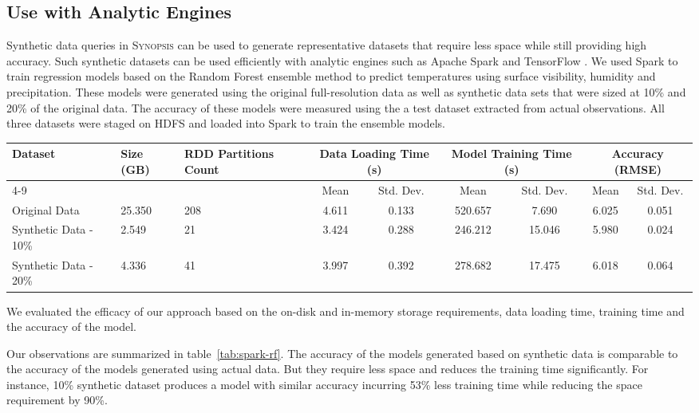 \subsection{Use with Analytic Engines}
Synthetic data queries in \textsc{Synopsis} can be used to generate representative datasets that require less space while still providing high accuracy.  
Such synthetic datasets can be used efficiently with analytic engines such as Apache Spark \cite{zaharia2010spark} and TensorFlow \cite{tensorflow}.  
We used Spark to train regression models based on the Random Forest ensemble method to predict temperatures using surface visibility, humidity and precipitation.
These models were generated using the original full-resolution data as well as synthetic data sets that were sized at 10\% and 20\% of the original data.
The accuracy of these models were measured using the a test dataset extracted from actual observations.
All three datasets were staged on HDFS and loaded into Spark to train the ensemble models.
%
\begin{table*}
    \renewcommand{\arraystretch}{1.3}
    \caption{Comparing Random Forest based regression models generated by Spark MLlib using synthetic vs. real data}
    \label{tab:spark-rf}
    \begin{center}
        \begin{tabularx}{0.98\textwidth}{|X|X|X|c|c|c|c|c|c|}
            \hline
            \multirow{2}{*}{Dataset} & \multirow{2}{*}{Size (GB)} & \multirow{2}{*}{RDD Partitions Count} & \multicolumn{2}{c|}{\cellcolor[gray]{0.7}Data Loading Time (s)} &\multicolumn{2}{c|}{\cellcolor[gray]{0.7}Model Training Time (s)} & \multicolumn{2}{c|}{\cellcolor[gray]{0.7}Accuracy (RMSE)}\\
            \cline{4-9}
             & & & \cellcolor[gray]{0.9}Mean & \cellcolor[gray]{0.9}Std. Dev.  &  \cellcolor[gray]{0.9}Mean & \cellcolor[gray]{0.9}Std. Dev. &  \cellcolor[gray]{0.9}Mean & \cellcolor[gray]{0.9}Std. Dev. \\
            \hline
            Original Data & 25.350 & 208 & 4.611 & 0.133 & 520.657 & 7.690 & 6.025 & 0.051 \\
            \hline
            Synthetic Data - 10\% & 2.549 & 21 & 3.424 & 0.288 & 246.212 & 15.046 & 5.980 & 0.024 \\
            \hline
            Synthetic Data - 20\% & 4.336 & 41 & 3.997 & 0.392 & 278.682 & 17.475 & 6.018 & 0.064 \\
            \hline
		\end{tabularx}
	\end{center}
\end{table*}
%
We evaluated the efficacy of our approach based on the on-disk and in-memory storage requirements, data loading time, training time and the accuracy of the model.

Our observations are summarized in table~\ref{tab:spark-rf}.
The accuracy of the models generated based on synthetic data is comparable to the accuracy of the models generated using actual data.
But they require less space and reduces the training time significantly.
For instance, 10\% synthetic dataset produces a model with similar accuracy incurring 53\% less training time while reducing the space requirement by 90\%. 
